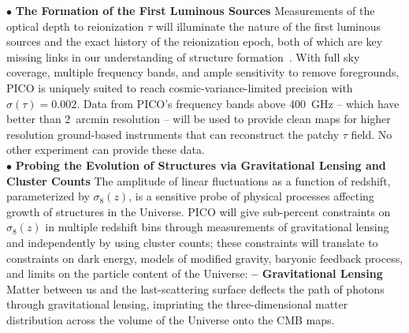 \documentclass[PICOAPC.tex]{subfiles}
\begin{document}
 
$\bullet$ {\bf The Formation of the First Luminous Sources} \hspace{0.1in} \label{sec:luminoussources}  Measurements of the optical depth to reionization $\tau$ will illuminate the nature of the first luminous sources and the exact history of the reionization epoch, both of which are key missing links in our understanding of structure formation~\citep{alvarez_swp}.  With full sky coverage, multiple frequency bands, and ample sensitivity to remove foregrounds, PICO is uniquely suited to reach cosmic-variance-limited precision with $\sigma(\tau)=0.002$. Data from PICO's frequency bands above 400~GHz -- which have better than 2~arcmin resolution  -- will be used to provide clean maps for higher resolution ground-based instruments that can reconstruct the patchy $\tau$ field. No other experiment can provide these data. \\
%
$\bullet$ {\bf Probing the Evolution of Structures via Gravitational Lensing and Cluster Counts} \hspace{0.1in} \label{sec:gravitationallensing}   
The amplitude of linear fluctuations as a function of redshift, parameterized by $\sigma_8(z)$, is a sensitive probe of physical processes affecting growth of structures in the Universe. PICO will give sub-percent constraints on $\sigma_8(z)$ in multiple redshift bins through measurements of gravitational lensing and independently by using cluster counts; these constraints will translate to constraints on dark energy, models of modified gravity, baryonic feedback process, and limits on the particle content of the Universe: 
{\bf -- Gravitational Lensing} \hspace{0.1in} \label{lensing} Matter between us and the last-scattering surface deflects the path of photons through gravitational lensing, imprinting the three-dimensional matter distribution across the volume of the Universe onto the CMB maps. 
\end{document}
